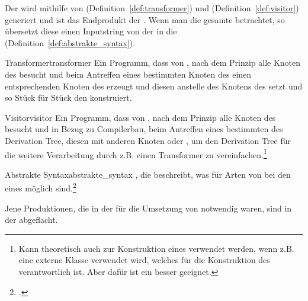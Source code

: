 
Der  wird mithilfe von  (Definition~\ref{def:transformer}) und  (Definition~\ref{def:visitor}) generiert und ist das Endprodukt der . Wenn man die gesamte  betrachtet, so übersetzt diese einen Inputstring von der  in die  (Definition~\ref{def:abstrakte_syntax}).

\begin{Definition}{Transformer}{transformer}
Ein Programm, dass von , nach dem  Prinzip alle Knoten des  besucht und beim Antreffen eines bestimmten Knoten des  einen entsprechenden Knoten des  erzeugt und diesen anstelle des Knotens des  setzt und so Stück für Stück den  konstruiert.
\end{Definition}

\begin{Definition}{Visitor}{visitor}
  Ein Programm, dass von , nach dem  Prinzip alle Knoten des  besucht und in Bezug zu Compilerbau, beim Antreffen eines bestimmten  des Derivation Tree, diesen  mit anderen Knoten  oder , um den Derivation Tree für die weitere Verarbeitung durch z.B. einen Transformer zu vereinfachen.\footnote{Kann theoretisch auch zur Konstruktion eines  verwendet werden, wenn z.B. eine externe Klasse verwendet wird, welches für die Konstruktion des  verantwortlich ist. Aber dafür ist ein  besser geeignet.}
\end{Definition}

\begin{Definition}{Abstrakte Syntax}{abstrakte_syntax}
  , die beschreibt, was für Arten von  bei den  eines  möglich sind.\footcite{noauthor_course_2022}

  Jene Produktionen, die in der  für die Umsetzung von  notwendig waren, sind in der  abgeflacht.
\end{Definition}


